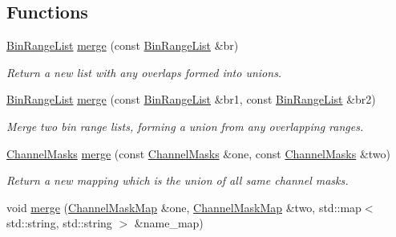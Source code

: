 \subsection*{Functions}
\begin{DoxyCompactItemize}
\item 
\hyperlink{namespace_wire_cell_1_1_waveform_ae9e850f13cd7f9cbcc309a5d7dd2fd37}{Bin\+Range\+List} \hyperlink{namespace_wire_cell_1_1_waveform_a992189c16e04b7302539d42c94f9e296}{merge} (const \hyperlink{namespace_wire_cell_1_1_waveform_ae9e850f13cd7f9cbcc309a5d7dd2fd37}{Bin\+Range\+List} \&br)
\begin{DoxyCompactList}\small\item\em Return a new list with any overlaps formed into unions. \end{DoxyCompactList}\item 
\hyperlink{namespace_wire_cell_1_1_waveform_ae9e850f13cd7f9cbcc309a5d7dd2fd37}{Bin\+Range\+List} \hyperlink{namespace_wire_cell_1_1_waveform_af5a11c1c84f74aa42aedcc16029cb1c7}{merge} (const \hyperlink{namespace_wire_cell_1_1_waveform_ae9e850f13cd7f9cbcc309a5d7dd2fd37}{Bin\+Range\+List} \&br1, const \hyperlink{namespace_wire_cell_1_1_waveform_ae9e850f13cd7f9cbcc309a5d7dd2fd37}{Bin\+Range\+List} \&br2)
\begin{DoxyCompactList}\small\item\em Merge two bin range lists, forming a union from any overlapping ranges. \end{DoxyCompactList}\item 
\hyperlink{namespace_wire_cell_1_1_waveform_a3d2f1baf84b749d139533ebd4d4da3f0}{Channel\+Masks} \hyperlink{namespace_wire_cell_1_1_waveform_a49c3b64d64db947f08b1eedcf4c47772}{merge} (const \hyperlink{namespace_wire_cell_1_1_waveform_a3d2f1baf84b749d139533ebd4d4da3f0}{Channel\+Masks} \&one, const \hyperlink{namespace_wire_cell_1_1_waveform_a3d2f1baf84b749d139533ebd4d4da3f0}{Channel\+Masks} \&two)
\begin{DoxyCompactList}\small\item\em Return a new mapping which is the union of all same channel masks. \end{DoxyCompactList}\item 
void \hyperlink{namespace_wire_cell_1_1_waveform_aaa9e0dfb1762dd280646e4b3c123d3ef}{merge} (\hyperlink{namespace_wire_cell_1_1_waveform_a18b9ae61c858e340252ba3ac83ac3bc0}{Channel\+Mask\+Map} \&one, \hyperlink{namespace_wire_cell_1_1_waveform_a18b9ae61c858e340252ba3ac83ac3bc0}{Channel\+Mask\+Map} \&two, std\+::map$<$ std\+::string, std\+::string $>$ \&name\+\_\+map)

\end{DoxyCompactItemize}
